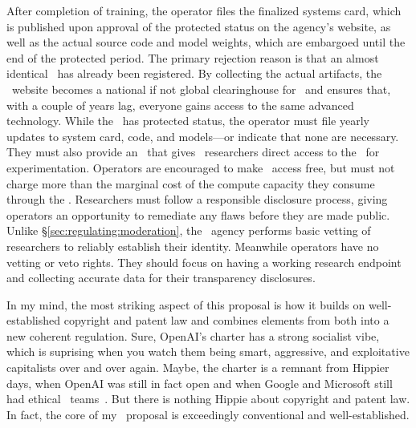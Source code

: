 After completion of training, the operator files the finalized systems card,
which is published upon approval of the protected status on the agency's
website, as well as the actual source code and model weights, which are
embargoed until the end of the protected period. The primary rejection reason is
that an almost identical \AI\ has already been registered. By collecting the
actual artifacts, the \AIP\ website becomes a national if not global
clearinghouse for \AI\ and ensures that, with a couple of years lag, everyone
gains access to the same advanced technology. While the \AI\ has protected
status, the operator must file yearly updates to system card, code, and
models---or indicate that none are necessary. They must also provide an \API\
that gives \AI\ researchers direct access to the \AI\ for experimentation.
Operators are encouraged to make \API\ access free, but must not charge more
than the marginal cost of the compute capacity they consume through the \API.
Researchers must follow a responsible disclosure process, giving operators an
opportunity to remediate any flaws before they are made public. Unlike
\S\ref{sec:regulating:moderation}, the \AIP\ agency performs basic vetting of
researchers to reliably establish their identity. Meanwhile operators have no
vetting or veto rights. They should focus on having a working research endpoint
and collecting accurate data for their transparency disclosures.

In my mind, the most striking aspect of this proposal is how it builds on
well-established copyright and patent law and combines elements from both into a
new coherent regulation. Sure, OpenAI's charter has a strong socialist vibe,
which is suprising when you watch them being smart, aggressive, and exploitative
capitalists over and over again. Maybe, the charter is a remnant from Hippier
days, when OpenAI was still in fact open and when Google and Microsoft still had
ethical \AI\ teams~\cite{GrantBassea2021,GrantEidelson2022,Newton2023}. But
there is nothing Hippie about copyright and patent law. In fact, the core of my
\AIP\ proposal is exceedingly conventional and well-established.
